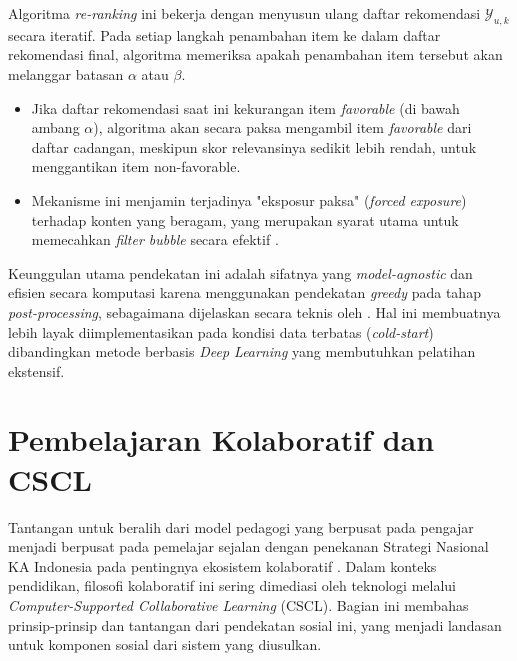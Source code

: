 Algoritma \textit{re-ranking} ini bekerja dengan menyusun ulang daftar
rekomendasi $\mathcal{Y}_{u,k}$ secara iteratif. Pada setiap langkah penambahan
item ke dalam daftar rekomendasi final, algoritma memeriksa apakah penambahan
item tersebut akan melanggar batasan $\alpha$ atau $\beta$.
\begin{itemize}
    \item Jika daftar rekomendasi saat ini kekurangan item \textit{favorable}
    (di bawah ambang $\alpha$), algoritma akan secara paksa mengambil item
    \textit{favorable} dari daftar cadangan, meskipun skor relevansinya sedikit
    lebih rendah, untuk menggantikan item non-favorable.
    \item Mekanisme ini menjamin terjadinya "eksposur paksa" (\textit{forced
    exposure}) terhadap konten yang beragam, yang merupakan syarat utama untuk
    memecahkan \textit{filter bubble} secara efektif \autocite{DeBiasio2023}.
\end{itemize}

Keunggulan utama pendekatan ini adalah sifatnya yang \textit{model-agnostic} dan
efisien secara komputasi karena menggunakan pendekatan \textit{greedy} pada
tahap \linebreak \textit{post-processing}, sebagaimana dijelaskan secara teknis oleh
\textcite{DeBiasio2023}. Hal ini membuatnya lebih layak diimplementasikan pada
kondisi data terbatas (\textit{cold-start}) dibandingkan metode berbasis
\textit{Deep Learning} yang membutuhkan pelatihan ekstensif.


\section{Pembelajaran Kolaboratif dan CSCL}
\label{sec:collaborative_learning}
Tantangan untuk beralih dari model pedagogi yang berpusat pada pengajar menjadi
berpusat pada pemelajar \autocite{Ryoo2021} sejalan dengan penekanan Strategi Nasional
KA Indonesia pada pentingnya ekosistem kolaboratif \autocite{BPPT2020}. Dalam konteks
pendidikan, filosofi kolaboratif ini sering dimediasi oleh teknologi melalui
\textit{Computer-Supported Collaborative Learning} (CSCL). Bagian ini membahas
prinsip-prinsip dan tantangan dari pendekatan sosial ini, yang menjadi landasan
untuk komponen sosial dari sistem yang diusulkan.

